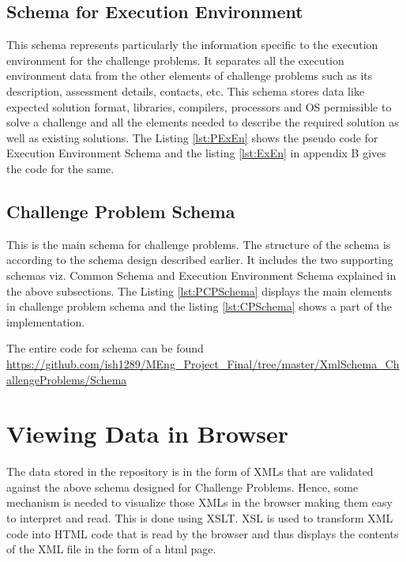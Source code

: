 \documentclass[11pt,letterpaper]{report}
\begin{document}


\subsection{Schema for Execution Environment}
This schema represents particularly the information specific to the execution environment for the challenge problems. It separates all the execution environment data from the other elements of challenge problems such as its description, assessment details, contacts, etc. This schema stores data like expected solution format, libraries, compilers, processors and OS permissible to solve a challenge and  all the elements needed to describe the required solution as well as existing solutions. The Listing \ref{lst:PExEn} shows the pseudo code for Execution Environment Schema and the listing \ref{lst:ExEn} in appendix B gives the code for the same.



\subsection{Challenge Problem Schema}
This is the main schema for challenge problems. The structure of the schema is according to the schema design described earlier. It includes the two supporting schemas viz. Common Schema and Execution Environment Schema explained in the above subsections. The Listing \ref{lst:PCPSchema} displays the main elements in challenge problem schema and the listing \ref{lst:CPSchema} shows a part of the implementation.

The entire code for schema can be found \url{https://github.com/ish1289/MEng_Project_Final/tree/master/XmlSchema_ChallengeProblems/Schema}



\section{Viewing Data in Browser}
The data stored in the repository is in the form of XMLs that are validated against the above schema designed for Challenge Problems. Hence, some mechanism is needed to visualize those XMLs in the browser making them easy to interpret and read. This is done using XSLT. XSL is used to transform XML code into HTML code that is read by the browser and thus displays the contents of the XML file in the form of a html page. 
\end{document}
